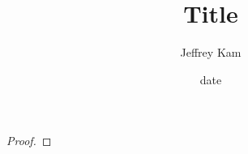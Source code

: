 \documentclass[assignment]{twl}
\title{Title}
\date{date}
\author{Jeffrey Kam}
\begin{document}
\begin{problem}
\end{problem}


\begin{proof}
\end{proof}
\end{document}
